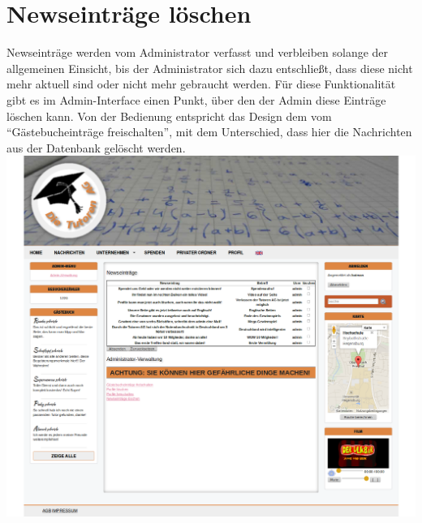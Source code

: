 
\section{Newseinträge löschen}
Newseinträge werden vom Administrator verfasst und verbleiben solange der allgemeinen Einsicht, bis der Administrator sich dazu entschließt, dass diese nicht mehr aktuell sind oder nicht mehr gebraucht werden.
Für diese Funktionalität gibt es im Admin-Interface einen Punkt, über den der Admin diese Einträge löschen kann. Von der Bedienung entspricht das Design dem vom ``Gästebucheinträge freischalten'', mit dem Unterschied, dass
hier die Nachrichten aus der Datenbank gelöscht werden.\\
\includegraphics[width=1\textwidth]{../Screenshots/de/admin/admin_news}